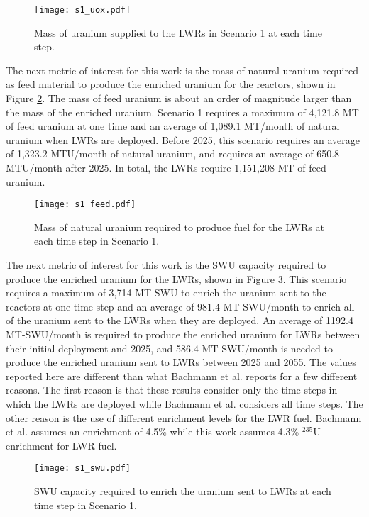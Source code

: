\begin{figure}
    \centering
    \texttt{[image: s1\_uox.pdf]}
    \caption{Mass of uranium supplied to the LWRs in Scenario 1 at each time step.}
    \label{fig:fuel1}
\end{figure}

The next metric of interest for this work is the mass of natural uranium 
required as feed material to produce the enriched uranium for the 
reactors, shown in Figure \ref{fig:feed1}. The mass of feed uranium 
is about an order of magnitude larger than the mass of the enriched uranium. 
Scenario 1 requires a maximum of 4,121.8 MT of 
feed uranium at one time and an average of 1,089.1 MT/month of natural uranium 
when \glspl{LWR} are deployed. Before 2025, this scenario requires an average of 
1,323.2 MTU/month of natural uranium, and requires an average of 650.8 MTU/month 
after 2025. In total, the \glspl{LWR} require 1,151,208 MT of feed uranium.

\begin{figure}
    \centering
    \texttt{[image: s1\_feed.pdf]}
    \caption{Mass of natural uranium required to produce fuel for the LWRs at each 
    time step in Scenario 1.}
    \label{fig:feed1}
\end{figure}

The next metric of interest for this work is the \gls{SWU} capacity required 
to produce the enriched uranium for the \glspl{LWR}, 
shown in Figure \ref{fig:swu1}. This scenario requires a maximum of 3,714 
MT-SWU to 
enrich the uranium sent to the reactors at one time step and an average of 
981.4 MT-SWU/month to enrich all of the uranium sent to 
the \glspl{LWR} when they are deployed. An average of 
1192.4 MT-SWU/month is required to produce the enriched uranium 
for \glspl{LWR} between their initial deployment and 2025, and 
586.4 MT-SWU/month is needed to produce the 
enriched uranium sent to \glspl{LWR} between 2025 and 2055. The values 
reported here are different than what Bachmann et al. \cite{bachmann_enrichment_2021}
reports for a few different reasons. The first reason is that these results  
consider only
the time steps in which the \glspl{LWR} are deployed while Bachmann et al. 
considers all time steps. The other reason
is the use of different enrichment levels for the \gls{LWR} fuel. 
Bachmann et al. assumes an enrichment of 4.5\% while this work assumes 4.3\%
$^{235}$U enrichment for \gls{LWR} fuel. 


\begin{figure}
    \centering
    \texttt{[image: s1\_swu.pdf]}
    \caption{SWU capacity required to enrich the uranium sent to LWRs at each time step in Scenario 1.}
    \label{fig:swu1}
\end{figure}

